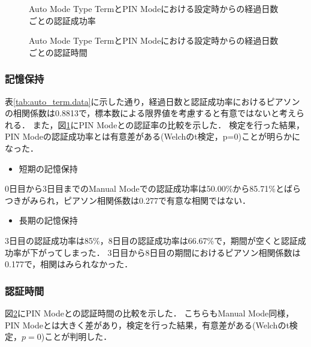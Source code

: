 \begin{figure}[ht]
  \begin{center}
  \end{center}
  \caption{Auto Mode Type TermとPIN Modeにおける設定時からの経過日数ごとの認証成功率}
  \label{fig:ex_auto_term_vs_pin_rate}
\end{figure}

\begin{figure}[hb]
  \begin{center}
  \end{center}
  \caption{Auto Mode Type TermとPIN Modeにおける設定時からの経過日数ごとの認証時間}
  \label{fig:ex_auto_term_vs_pin_time}
\end{figure}

\subsubsection{記憶保持}
表\ref{tab:auto_term.data}に示した通り，経過日数と認証成功率におけるピアソンの相関係数は0.8813で，標本数による限界値を考慮すると有意ではないと考えられる．
また，図\ref{fig:ex_auto_term_vs_pin_rate}にPIN Modeとの認証率の比較を示した．
検定を行った結果，PIN Modeの認証成功率とは有意差がある(Welchのt検定，p=0)ことが明らかになった．
\begin{itemize}
  \item 短期の記憶保持
\end{itemize}
0日目から3日目までのManual Modeでの認証成功率は50.00\%から85.71\%とばらつきがみられ，ピアソン相関係数は0.277で有意な相関ではない．

\begin{itemize}
  \item 長期の記憶保持
\end{itemize}
3日目の認証成功率は85\%，8日目の認証成功率は66.67\%で，期間が空くと認証成功率が下がってしまった．
3日目から8日目の期間におけるピアソン相関係数は0.177で，相関はみられなかった．

\subsubsection{認証時間}
図\ref{fig:ex_auto_term_vs_pin_time}にPIN Modeとの認証時間の比較を示した．
こちらもManual Mode同様，PIN Modeとは大きく差があり，検定を行った結果，有意差がある(Welchのt検定，$ p = 0 $)ことが判明した．

